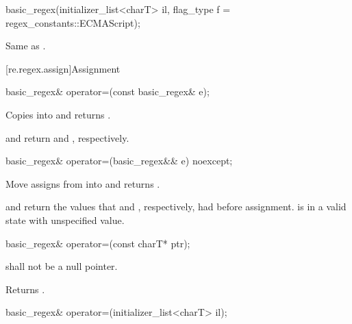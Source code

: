 %
\begin{itemdecl}
basic_regex(initializer_list<charT> il, flag_type f = regex_constants::ECMAScript);
\end{itemdecl}

\begin{itemdescr}
\pnum
\effects Same as .
\end{itemdescr}

[re.regex.assign]{Assignment}

%
\begin{itemdecl}
basic_regex& operator=(const basic_regex& e);
\end{itemdecl}

\begin{itemdescr}
\pnum
\effects Copies  into  and returns .

\pnum\ensures
{} and  return
 and , respectively.
\end{itemdescr}

%
\begin{itemdecl}
basic_regex& operator=(basic_regex&& e) noexcept;
\end{itemdecl}

\begin{itemdescr}
\pnum
\effects Move assigns from  into  and returns .

\pnum
\ensures {} and  return the values that
 and , respectively, had before assignment.
 is in a valid state with unspecified value.
\end{itemdescr}

%
\begin{itemdecl}
basic_regex& operator=(const charT* ptr);
\end{itemdecl}

\begin{itemdescr}
\pnum
\requires {} shall not be a null pointer.

\pnum
\effects Returns .
\end{itemdescr}

%
\begin{itemdecl}
basic_regex& operator=(initializer_list<charT> il);
\end{itemdecl}

